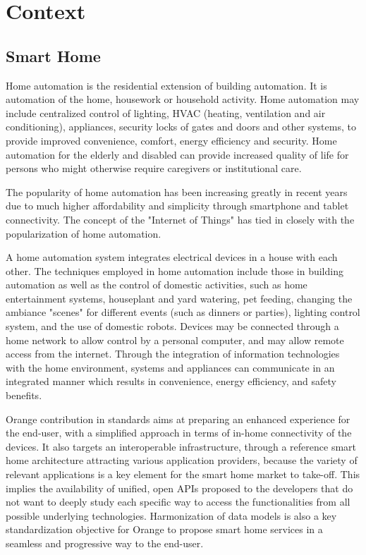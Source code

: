 
\section{Context}
\subsection{Smart Home}

Home automation \citep{homeautomation} is the residential extension of building automation. It is automation of the home, housework or household activity. Home automation may include centralized control of lighting, HVAC (heating, ventilation and air conditioning), appliances, security locks of gates and doors and other systems, to provide improved convenience, comfort, energy efficiency and security. Home automation for the elderly and disabled can provide increased quality of life for persons who might otherwise require caregivers or institutional care.

The popularity of home automation has been increasing greatly in recent years due to much higher affordability and simplicity through smartphone and tablet connectivity. The concept of the "Internet of Things" has tied in closely with the popularization of home automation.

A home automation system \citep{homeautomation1} integrates electrical devices in a house with each other. The techniques employed in home automation include those in building automation as well as the control of domestic activities, such as home entertainment systems, houseplant and yard watering, pet feeding, changing the ambiance "scenes" for different events (such as dinners or parties), lighting control system, and the use of domestic robots. Devices may be connected through a home network to allow control by a personal computer, and may allow remote access from the internet. Through the integration of information technologies with the home environment, systems and appliances can communicate in an integrated manner which results in convenience, energy efficiency, and safety benefits.

Orange contribution in standards aims at preparing an enhanced experience for the end-user, with a simplified approach in terms of in-home connectivity of the devices. It also targets an interoperable infrastructure, through a reference smart home architecture attracting various application providers, because the variety of relevant applications is a key element for the smart home market to take-off. This implies the availability of unified, open APIs proposed to the developers that do not want to deeply study each specific way to access the functionalities from all possible underlying technologies. Harmonization of data models is also a key standardization objective for Orange to propose smart home services in a seamless and progressive way to the end-user.
